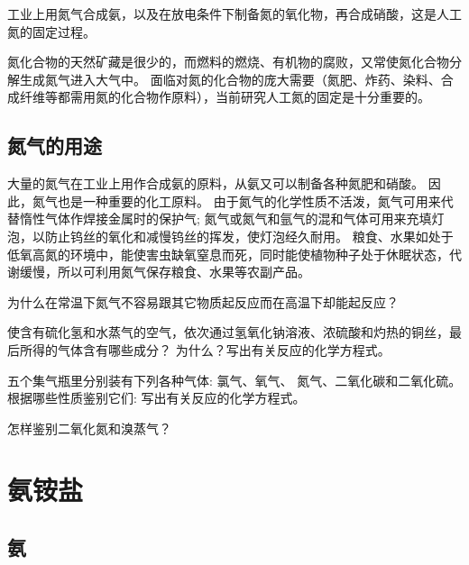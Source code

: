 工业上用氮气合成氨，以及在放电条件下制备氮的氧化物，再合成硝酸，这是人工氮的固定过程。

氮化合物的天然矿藏是很少的，而燃料的燃烧、有机物的腐败，又常使氮化合物分解生成氮气进入大气中。
面临对氮的化合物的庞大需要（氮肥、炸药、染料、合成纤维等都需用氮的化合物作原料），当前研究人工氮的固定是十分重要的。

\subsection{氮气的用途}
大量的氮气在工业上用作合成氨的原料，从氨又可以制备各种氮肥和硝酸。
因此，氮气也是一种重要的化工原料。
由于氮气的化学性质不活泼，氮气可用来代替惰性气体作焊接金属时的保护气; 氮气或氮气和氩气的混和气体可用来充填灯泡，以防止钨丝的氧化和减慢钨丝的挥发，使灯泡经久耐用。
粮食、水果如处于低氧高氮的环境中，能使害虫缺氧窒息而死，同时能使植物种子处于休眠状态，代谢缓慢，所以可利用氮气保存粮食、水果等农副产品。

\begin{Practice}
\begin{question}
  \item 为什么在常温下氮气不容易跟其它物质起反应而在高温下却能起反应？
  \item 使含有硫化氢和水蒸气的空气，依次通过氢氧化钠溶液、浓硫酸和灼热的铜丝，最后所得的气体含有哪些成分？ 为什么？写出有关反应的化学方程式。
  \item 五个集气瓶里分别装有下列各种气体: 氯气、氧气、 氮气、二氧化碳和二氧化硫。根据哪些性质鉴别它们: 写出有关反应的化学方程式。
  \item 怎样鉴别二氧化氮和溴蒸气？
\end{question}
\end{Practice}

\section{氨\texorpdfstring{\quad}{ }铵盐}
\subsection{氨}

